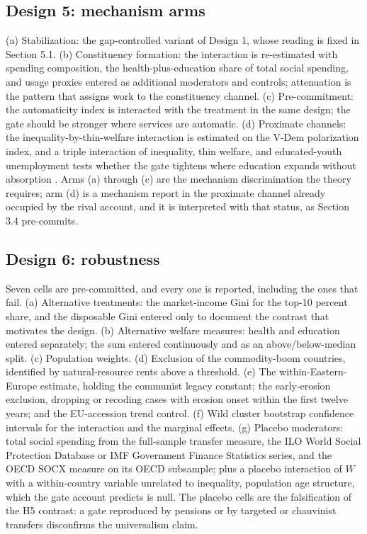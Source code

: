 \documentclass[11pt,letterpaper]{article}
\begin{document}
\subsection{Design 5: mechanism arms}

(a) Stabilization: the gap-controlled variant of Design 1, whose reading is fixed in Section 5.1. (b) Constituency formation: the interaction is re-estimated with spending composition, the health-plus-education share of total social spending, and usage proxies entered as additional moderators and controls; attenuation is the pattern that assigns work to the constituency channel. (c) Pre-commitment: the automaticity index is interacted with the treatment in the same design; the gate should be stronger where services are automatic. (d) Proximate channels: the inequality-by-thin-welfare interaction is estimated on the V-Dem polarization index, and a triple interaction of inequality, thin welfare, and educated-youth unemployment tests whether the gate tightens where education expands without absorption \citep{CampanteChor2012}. Arms (a) through (c) are the mechanism discrimination the theory requires; arm (d) is a mechanism report in the proximate channel already occupied by the rival account, and it is interpreted with that status, as Section 3.4 pre-commits.

\subsection{Design 6: robustness}

Seven cells are pre-committed, and every one is reported, including the ones that fail. (a) Alternative treatments: the market-income Gini for the top-10 percent share, and the disposable Gini entered only to document the contrast that motivates the design. (b) Alternative welfare measures: health and education entered separately; the sum entered continuously and as an above/below-median split. (c) Population weights. (d) Exclusion of the commodity-boom countries, identified by natural-resource rents above a threshold. (e) The within-Eastern-Europe estimate, holding the communist legacy constant; the early-erosion exclusion, dropping or recoding cases with erosion onset within the first twelve years; and the EU-accession trend control. (f) Wild cluster bootstrap confidence intervals for the interaction and the marginal effects. (g) Placebo moderators: total social spending from the full-sample transfer measure, the ILO World Social Protection Database or IMF Government Finance Statistics series, and the OECD SOCX measure on its OECD subsample; plus a placebo interaction of $W$ with a within-country variable unrelated to inequality, population age structure, which the gate account predicts is null. The placebo cells are the falsification of the H5 contrast: a gate reproduced by pensions or by targeted or chauvinist transfers disconfirms the universalism claim.
\end{document}
